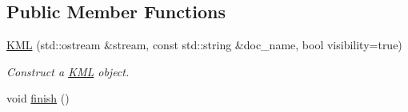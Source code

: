 \subsection*{Public Member Functions}
\begin{DoxyCompactItemize}
\item 
\hyperlink{classgeo__data_1_1KML_abcd98547b50dbb378c1a634caa0911e2}{K\+ML} (std\+::ostream \&stream, const std\+::string \&doc\+\_\+name, bool visibility=true)
\begin{DoxyCompactList}\small\item\em Construct a \hyperlink{classgeo__data_1_1KML}{K\+ML} object. \end{DoxyCompactList}\item 
void \hyperlink{classgeo__data_1_1KML_a15aba5605fcae13de084543588d04b65}{finish} ()\hypertarget{classgeo__data_1_1KML_a15aba5605fcae13de084543588d04b65}{}\label{classgeo__data_1_1KML_a15aba5605fcae13de084543588d04b65}


\end{DoxyCompactItemize}
